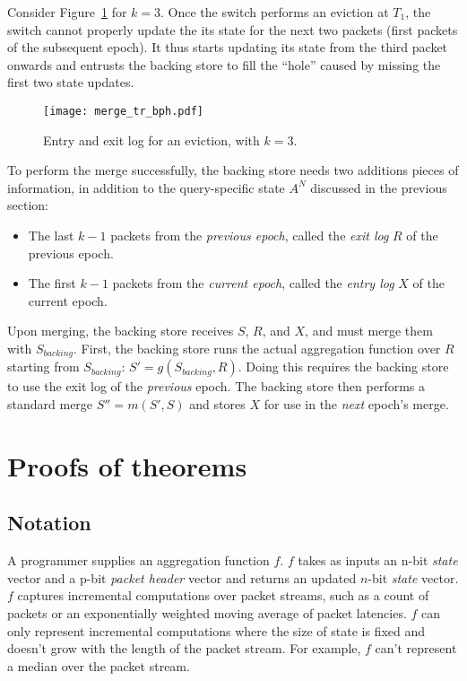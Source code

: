 Consider Figure~\ref{fig:bph-merge} for $k = 3$. Once the switch performs an eviction at $T_1$,
the switch cannot properly update the its state for the next two packets (first packets of the subsequent epoch).
It thus starts updating its state from the third packet onwards and entrusts the backing store to
fill the ``hole'' caused by missing the first two state updates.

\begin{figure}[h]
\centering
\texttt{[image: merge\_tr\_bph.pdf]}
\caption{Entry and exit log for an eviction, with $k = 3$.}
\label{fig:bph-merge}
\end{figure}

To perform the merge successfully,
the backing
store needs two additions pieces of information, 
in addition to the query-specific state $A^N$ discussed in the previous section:
\begin{itemize}
\item The last $k-1$ packets from the \emph{previous epoch}, called the \emph{exit log} $R$ of the previous epoch.
\item The first $k-1$ packets from the \emph{current epoch}, called the \emph{entry log} $X$ of the current epoch. 
\end{itemize}

Upon merging, the backing store receives $S$, $R$, and $X$, and must merge them with $S_{backing}$. First, the backing store runs the actual aggregation function over $R$ starting from $S_{backing}$: $S' = g(S_{backing}, R)$. Doing this requires the backing store to use the exit log of the \emph{previous} epoch. The backing store then performs a standard merge
 $S'' = m(S', S)$ and stores $X$ for use in the \emph{next} epoch's merge.

\section{Proofs of theorems}

\subsection{Notation}

A programmer supplies an aggregation function $f$. $f$ takes as inputs an n-bit \emph{state}
vector and a p-bit \emph{packet header} vector and returns an updated $n$-bit
\emph{state} vector. $f$ captures incremental computations over packet streams,
such as a count of packets or an exponentially weighted moving average of
packet latencies. $f$ can only represent incremental computations where the
size of state is fixed and doesn't grow with the length of the packet stream.
For example, $f$ can't represent a median over the packet stream.

